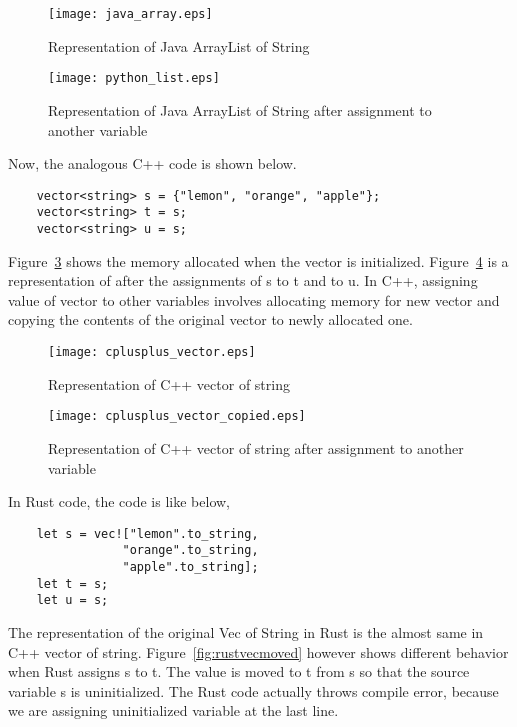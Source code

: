 \begin{figure}[htb]
    \texttt{[image: java\_array.eps]}
    \caption{Representation of Java ArrayList of String}
    \label{fig:javalist}
\end{figure}

\begin{figure}[htb]
    \texttt{[image: python\_list.eps]}
    \caption{Representation of Java ArrayList of String after assignment to another variable}
    \label{fig:pythonlistcopied}
\end{figure}

Now, the analogous C++ code is shown below. 
\begin{lstlisting}
    vector<string> s = {"lemon", "orange", "apple"};
    vector<string> t = s;
    vector<string> u = s;
 \end{lstlisting}
Figure~\ref{fig:cpluscplusvector} shows the memory allocated when the vector is initialized. Figure~\ref{fig:cpluscplusvectorcopied} is a representation of after the assignments of s to t and to u. 
In C++, assigning value of vector to other variables involves allocating memory for new vector and copying the contents of the original vector to newly allocated one. 

\begin{figure}[htb]
    \texttt{[image: cplusplus\_vector.eps]}
    \caption{Representation of C++ vector of string}
    \label{fig:cpluscplusvector}
\end{figure}


\begin{figure}[htb]
    \texttt{[image: cplusplus\_vector\_copied.eps]}
    \caption{Representation of C++ vector of string after assignment to another variable}
    \label{fig:cpluscplusvectorcopied}
\end{figure}


In Rust code, the code is like below, 
\begin{lstlisting}
    let s = vec!["lemon".to_string, 
                "orange".to_string, 
                "apple".to_string];
    let t = s;
    let u = s;
 \end{lstlisting}

The representation of the original Vec of String in Rust is the almost same in C++ vector of string. Figure~\ref{fig:rustvecmoved} however shows different behavior when Rust assigns s to t. 
The value is moved to t from s so that the source variable s is uninitialized. The Rust code actually throws compile error, because we are assigning uninitialized variable at the last line.

